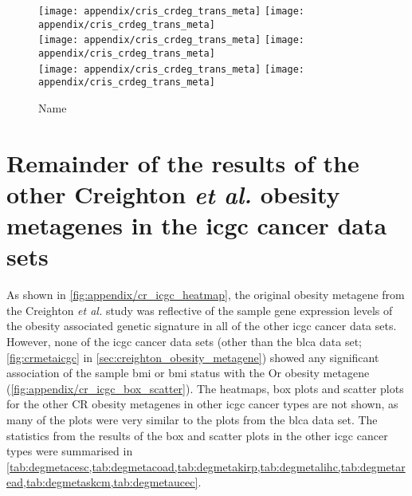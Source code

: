 \begin{appendices}
	\begin{figure}[htpb]
		\ContinuedFloat
		\captionsetup{list=off,format=cont}
		\centering
		\texttt{[image: appendix/cris\_crdeg\_trans\_meta]}
		\hfill
		\texttt{[image: appendix/cris\_crdeg\_trans\_meta]}\\
		\texttt{[image: appendix/cris\_crdeg\_trans\_meta]}
		\hfill
		\texttt{[image: appendix/cris\_crdeg\_trans\_meta]}\\
		\texttt{[image: appendix/cris\_crdeg\_trans\_meta]}
		\hfill
		\texttt{[image: appendix/cris\_crdeg\_trans\_meta]}\\
		\caption{Name}
	\end{figure}

	\section{Remainder of the results of the other Creighton \textit{et al.} obesity metagenes in the \gls{icgc} cancer data sets}
	\label{sec:rest_of_the_cr_icgc_cancer_heatmap_results}

	As shown in \cref{fig:appendix/cr_icgc_heatmap}, the original obesity metagene from the Creighton \textit{et al.} study was reflective of the sample gene expression levels of the obesity associated genetic signature in all of the other \gls{icgc} cancer data sets.
	However, none of the \gls{icgc} cancer data sets (other than the \gls{blca} data set; \cref{fig:crmetaicgc} in \cref{sec:creighton_obesity_metagene}) showed any significant association of the sample \gls{bmi} or \gls{bmi} status with the Or obesity metagene (\cref{fig:appendix/cr_icgc_box_scatter}).
	The heatmaps, box plots and scatter plots for the other CR obesity metagenes in other \gls{icgc} cancer types are not shown, as many of the plots were very similar to the plots from the \gls{blca} data set.
	The statistics from the results of the box and scatter plots in the other \gls{icgc} cancer types were summarised in \cref{tab:degmetacesc,tab:degmetacoad,tab:degmetakirp,tab:degmetalihc,tab:degmetaread,tab:degmetaskcm,tab:degmetaucec}.


\end{appendices}
